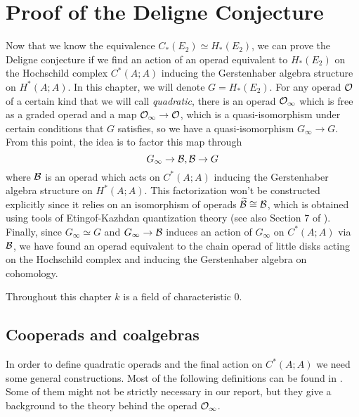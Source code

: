 \documentclass[TFM.tex]{subfiles}
\begin{document}
\chapter{Proof of the Deligne Conjecture}


Now that we know the equivalence $C_*(E_2)\simeq H_*(E_2)$, we can prove the Deligne conjecture if we find an action of an operad equivalent to $H_*(E_2)$ on the Hochschild complex $C^*(A;A)$ inducing the Gerstenhaber algebra structure on $H^*(A;A)$. In this chapter, we will denote $G=H_*(E_2)$. For any operad ${\mathcal O}$ of a certain kind that we will call \emph{quadratic}, there is an operad ${\mathcal O}_\infty$ which is free as a graded operad and a map ${\mathcal O}_\infty\to{\mathcal O}$, which is a quasi-isomorphism under certain conditions that $G$ satisfies, so we have a quasi-isomorphism $G_\infty\to G$. From this point, the idea is to factor this map through
\[
G_\infty\to \mathcal{B},\mathcal{B}\to G
\]
where $\mathcal{B}$ is an operad which acts on $C^*(A;A)$ inducing the Gerstenhaber algebra structure on $H^*(A;A)$.  This factorization won't be constructed explicitly since it relies on an isomorphism of operads $\widetilde{\mathcal{B}}\cong\mathcal{B}$, which is obtained using tools of Etingof-Kazhdan quantization theory \cite{EK} (see also Section 7 of \cite{Hinich}). Finally, since $G_\infty\simeq G$ and $G_\infty\to\mathcal{B}$ induces an action of $G_\infty$ on $C^*(A;A)$ via $\mathcal{B}$, we have found an operad equivalent to the chain operad of little disks acting on the Hochschild complex and inducing the Gerstenhaber algebra on cohomology. 

Throughout this chapter $k$ is a field of characteristic 0. 


\section{Cooperads and coalgebras}


In order to define quadratic operads and the final action on $C^*(A;A)$ we need some general constructions. Most of the following definitions can be found in \cite{Hinich}. Some of them might not be strictly necessary in our report, but they give a background to the theory behind the operad ${\mathcal O}_\infty$.
\end{document}

